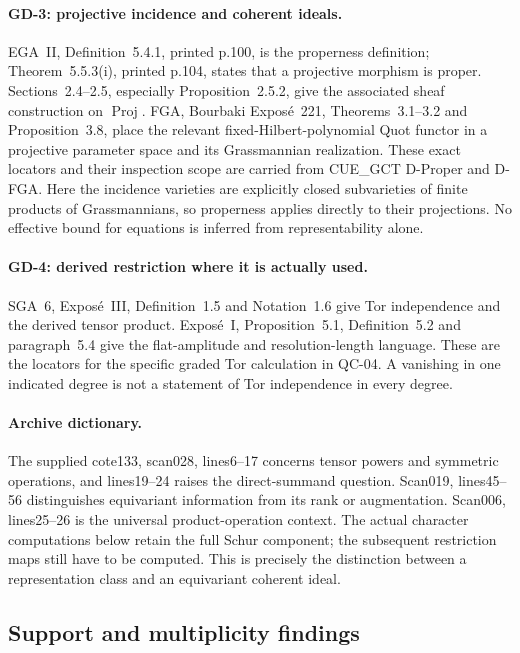 \paragraph{GD-3: projective incidence and coherent ideals.}
EGA~II, Definition~5.4.1, printed p.100, is the properness definition;
Theorem~5.5.3(i), printed p.104, states that a projective morphism is
proper. Sections~2.4--2.5, especially Proposition~2.5.2, give the
associated sheaf construction on $\operatorname{Proj}$.
FGA, Bourbaki Expos\'e~221, Theorems~3.1--3.2 and Proposition~3.8,
place the relevant fixed-Hilbert-polynomial Quot functor in a
projective parameter space and its Grassmannian realization.
These exact locators and their inspection scope are carried from
CUE\_GCT D-Proper and D-FGA. Here the incidence varieties are explicitly
closed subvarieties of finite products of Grassmannians, so properness
applies directly to their projections. No effective bound for equations
is inferred from representability alone.

\paragraph{GD-4: derived restriction where it is actually used.}
SGA~6, Expos\'e~III, Definition~1.5 and Notation~1.6 give Tor
independence and the derived tensor product. Expos\'e~I,
Proposition~5.1, Definition~5.2 and paragraph~5.4 give the flat-amplitude
and resolution-length language. These are the locators for the specific
graded Tor calculation in QC-04. A vanishing in one indicated degree
is not a statement of Tor independence in every degree.

\paragraph{Archive dictionary.}
The supplied cote133, scan028, lines6--17 concerns tensor powers and
symmetric operations, and lines19--24 raises the direct-summand
question. Scan019, lines45--56 distinguishes equivariant information
from its rank or augmentation. Scan006, lines25--26 is the universal
product-operation context. The actual character computations below
retain the full Schur component; the subsequent restriction maps still
have to be computed. This is precisely the distinction between a
representation class and an equivariant coherent ideal.

\subsection{Support and multiplicity findings}

